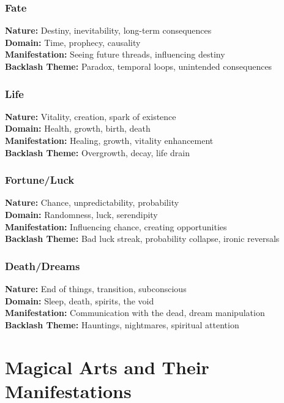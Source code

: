 \documentclass[11pt]{report}
\begin{document}
\subsubsection{Fate}
\textbf{Nature:} Destiny, inevitability, long-term consequences\\
\textbf{Domain:} Time, prophecy, causality\\
\textbf{Manifestation:} Seeing future threads, influencing destiny\\
\textbf{Backlash Theme:} Paradox, temporal loops, unintended consequences

\subsubsection{Life}
\textbf{Nature:} Vitality, creation, spark of existence\\
\textbf{Domain:} Health, growth, birth, death\\
\textbf{Manifestation:} Healing, growth, vitality enhancement\\
\textbf{Backlash Theme:} Overgrowth, decay, life drain

\subsubsection{Fortune/Luck}
\textbf{Nature:} Chance, unpredictability, probability\\
\textbf{Domain:} Randomness, luck, serendipity\\
\textbf{Manifestation:} Influencing chance, creating opportunities\\
\textbf{Backlash Theme:} Bad luck streak, probability collapse, ironic reversals

\subsubsection{Death/Dreams}
\textbf{Nature:} End of things, transition, subconscious\\
\textbf{Domain:} Sleep, death, spirits, the void\\
\textbf{Manifestation:} Communication with the dead, dream manipulation\\
\textbf{Backlash Theme:} Hauntings, nightmares, spiritual attention

\section{Magical Arts and Their Manifestations}
\end{document}
